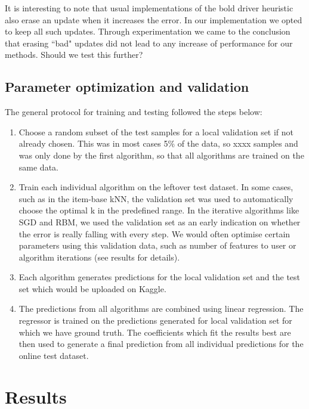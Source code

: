 \documentclass[10pt,conference,compsocconf]{IEEEtran}
\begin{document}
It is interesting to note that usual implementations of the bold driver heuristic also erase an update when it increases the error. In our implementation we opted to keep all such updates. Through experimentation we came to the conclusion that erasing ``bad" updates did not lead to any increase of performance for our methods. {\color{red} Should we test this further?}

\subsection{Parameter optimization and validation} 
The general protocol for training and testing followed the steps below:

\begin{enumerate}
\item Choose a random subset of the test samples for a local validation set if not already chosen. This was in most cases 5\% of the data, so xxxx samples and was only done by the first algorithm, so that all algorithms are trained on the same data.

\item Train each individual algorithm on the leftover test dataset. In some cases, such as in the item-base kNN, the validation set was used to automatically choose the optimal k in the predefined range. In the iterative algorithms like SGD and RBM, we used the validation set as an early indication on whether the error is really falling with every step. We would often optimise certain parameters using this validation data, such as number of features to user or algorithm iterations (see results for details).

\item Each algorithm generates predictions for the local validation set and the test set which would be uploaded on Kaggle.

\item The predictions from all algorithms are combined using linear regression. The regressor is trained on the predictions generated for local validation set for which we have ground truth. The coefficients which fit the results best are then used to generate a final prediction from all individual predictions for the online test dataset.

\end{enumerate}



\section{Results}
\label{sec:results}
\end{document}
